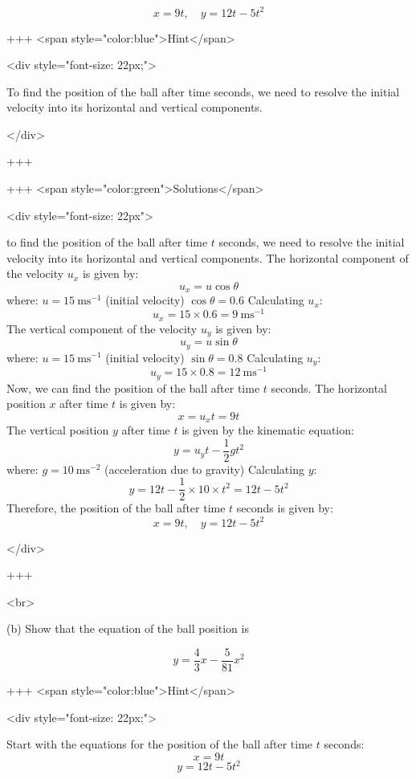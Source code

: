 \begin{equation}
x=9 t, \quad y=12 t-5 t^{2}
\end{equation}

+++ <span style="color:blue">Hint</span>

<div style="font-size: 22px;">

To find the position of the ball after time  seconds, we need to resolve the initial velocity into its horizontal and vertical components.

</div>

+++

+++ <span style="color:green">Solutions</span>

<div style="font-size: 22px">

to find the position of the ball after time $t$ seconds, we need to resolve the initial velocity into its horizontal and vertical components.
The horizontal component of the velocity $u_x$ is given by:
$$ u_x = u \cos \theta $$
where:
$u = 15 \mathrm{~ms}^{-1}$ (initial velocity)
$\cos \theta = 0.6$
Calculating $u_x$:
$$ u_x = 15 \times 0.6 = 9 \mathrm{~ms}^{-1} $$
The vertical component of the velocity $u_y$ is given by:
$$ u_y = u \sin \theta $$
where:
$u = 15 \mathrm{~ms}^{-1}$ (initial velocity)
$\sin \theta = 0.8$
Calculating $u_y$:
$$ u_y = 15 \times 0.8 = 12 \mathrm{~ms}^{-1} $$
Now, we can find the position of the ball after time $t$ seconds.
The horizontal position $x$ after time $t$ is given by:
$$ x = u_x t = 9t $$
The vertical position $y$ after time $t$ is given by the kinematic equation:
$$ y = u_y t - \frac{1}{2} g t^2 $$
where:
$g = 10 \mathrm{~ms}^{-2}$ (acceleration due to gravity)
Calculating $y$:
$$ y = 12t - \frac{1}{2} \times 10 \times t^2 = 12t - 5t^2 $$
Therefore, the position of the ball after time $t$ seconds is given by:
$$ x = 9t, \quad y = 12t - 5t^2 $$

</div>

+++

<br>


(b) Show that the equation of the ball position is

\begin{equation}
y=\frac{4}{3} x-\frac{5}{81} x^{2}
\end{equation}

+++ <span style="color:blue">Hint</span>

<div style="font-size: 22px;">

Start with the equations for the position of the ball after time $t$ seconds:
$$ x = 9t $$
$$ y = 12t - 5t^2 $$

